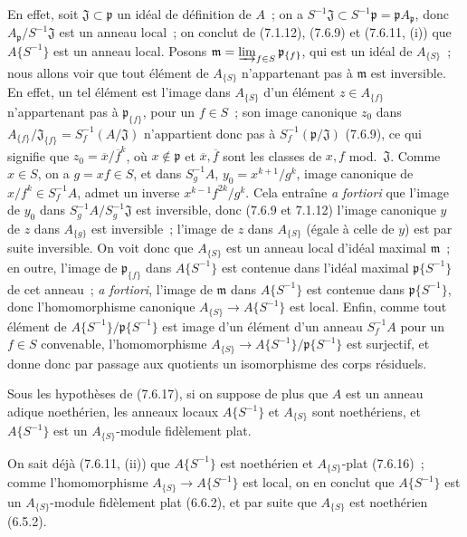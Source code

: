 En effet, soit $\mathfrak J\subset\mathfrak p$ un idéal de définition de
$A$~; on a $S^{-1}\mathfrak J\subset S^{-1}\mathfrak p=\mathfrak p
A_{\mathfrak p}$, donc $A_{\mathfrak p}/S^{-1}\mathfrak J$ est un anneau
local~; on conclut de (7.1.12), (7.6.9) et (7.6.11, (i)) que
$A\{S^{-1}\}$ est un anneau local. Posons
$\mathfrak m=\varinjlim_{f\in S}\mathfrak p_{\{f\}}$, qui est un idéal de
$A_{\{S\}}$~; nous allons voir que tout élément de $A_{\{S\}}$ n'appartenant
pas à $\mathfrak m$ est inversible. En effet, un tel élément est l'image dans
$A_{\{S\}}$ d'un élément $z\in A_{\{f\}}$ n'appartenant pas à
$\mathfrak p_{\{f\}}$, pour un $f\in S$~; son image canonique $z_0$ dans
$A_{\{f\}}/\mathfrak J_{\{f\}}=S_f^{-1}(A/\mathfrak J)$ n'appartient donc
pas à $S_f^{-1}(\mathfrak p/\mathfrak J)$ (7.6.9), ce qui signifie que
$z_0=\overline{x}/\overline{f}^k$, où $x\notin\mathfrak p$ et
$\overline{x},\overline{f}$ sont les classes de $x,f$ mod.~$\mathfrak J$.
Comme $x\in S$, on a $g=xf\in S$, et dans $S_g^{-1}A$,
$y_0=x^{k+1}/g^k$, image canonique de $x/f^k\in S_f^{-1}A$, admet un
inverse $x^{k-1}f^{2k}/g^k$. Cela entraîne \emph{a fortiori} que l'image de
$y_0$ dans $S_g^{-1}A/S_g^{-1}\mathfrak J$ est inversible, donc (7.6.9 et
7.1.12) l'image canonique $y$ de $z$ dans $A_{\{g\}}$ est inversible~;
l'image de $z$ dans $A_{\{S\}}$ (égale à celle de $y$) est par suite
inversible. On voit donc que $A_{\{S\}}$ est un anneau local d'idéal maximal
$\mathfrak m$~; en outre, l'image de $\mathfrak p_{\{f\}}$ dans
$A\{S^{-1}\}$ est contenue dans l'idéal maximal $\mathfrak p\{S^{-1}\}$ de
cet anneau~; \emph{a fortiori}, l'image de $\mathfrak m$ dans
$A\{S^{-1}\}$ est contenue dans $\mathfrak p\{S^{-1}\}$, donc
l'homomorphisme canonique $A_{\{S\}}\to A\{S^{-1}\}$ est local. Enfin,
comme tout élément de $A\{S^{-1}\}/\mathfrak p\{S^{-1}\}$ est image d'un
élément d'un anneau $S_f^{-1}A$ pour un $f\in S$ convenable,
l'homomorphisme $A_{\{S\}}\to A\{S^{-1}\}/\mathfrak p\{S^{-1}\}$ est
surjectif, et donne donc par passage aux quotients un isomorphisme des corps
résiduels.

\begin{corollary}[7.6.18]
\label{0.7.6.18-fr}
Sous les hypothèses de \textup{(7.6.17)}, si on suppose de plus que $A$ est un anneau
adique noethérien, les anneaux locaux $A\{S^{-1}\}$ et $A_{\{S\}}$ sont
noethériens, et $A\{S^{-1}\}$ est un $A_{\{S\}}$-module fidèlement plat.
\end{corollary}

On sait déjà (7.6.11, (ii)) que $A\{S^{-1}\}$ est noethérien et
$A_{\{S\}}$-plat (7.6.16)~; comme l'homomorphisme
$A_{\{S\}}\to A\{S^{-1}\}$ est local, on en conclut que $A\{S^{-1}\}$ est
un $A_{\{S\}}$-module fidèlement plat (6.6.2), et par suite que $A_{\{S\}}$
est noethérien (6.5.2).

